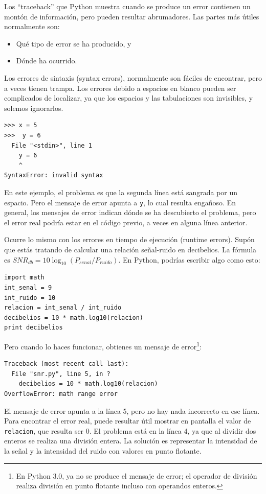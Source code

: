 Los ``traceback'' que Python muestra cuando se produce un error contienen
un montón de información, pero pueden resultar abrumadores. Las partes
más útiles normalmente son:

\begin{itemize}

\item Qué tipo de error se ha producido, y

\item Dónde ha ocurrido.

\end{itemize}

Los errores de sintaxis (syntax errors), normalmente son fáciles de encontrar, pero
a veces tienen trampa. Los errores debido a espacios en blanco pueden ser complicados de
localizar, ya que los espacios y las tabulaciones son invisibles, y solemos ignorarlos.


\beforeverb
\begin{verbatim}
>>> x = 5
>>>  y = 6
  File "<stdin>", line 1
    y = 6
    ^
SyntaxError: invalid syntax
\end{verbatim}
\afterverb
%
En este ejemplo, el problema es que la segunda línea está sangrada por
un espacio. Pero el mensaje de error apunta a {\tt y}, lo cual
resulta engañoso. En general, los mensajes de error indican dónde se ha
descubierto el problema, pero el error real podría estar en el código
previo, a veces en alguna línea anterior.


Ocurre lo mismo con los errores en tiempo de ejecución (runtime errors). Supón que estás tratando
de calcular una relación señal-ruido en decibelios. La fórmula
es $SNR_{db} = 10 \log_{10} (P_{senal} / P_{ruido})$. En Python,
podrías escribir algo como esto:

\beforeverb
\begin{verbatim}
import math
int_senal = 9
int_ruido = 10
relacion = int_senal / int_ruido
decibelios = 10 * math.log10(relacion)
print decibelios
\end{verbatim}
\afterverb
%
Pero cuando lo haces funcionar, obtienes un mensaje de error\footnote{En Python 3.0,
ya no se produce el mensaje de error; el operador de división realiza
división en punto flotante incluso con operandos enteros.}:


\beforeverb
\begin{verbatim}
Traceback (most recent call last):
  File "snr.py", line 5, in ?
    decibelios = 10 * math.log10(relacion)
OverflowError: math range error
\end{verbatim}
\afterverb
%
El mensaje de error apunta a la línea 5, pero no hay nada
incorrecto en ese línea. Para encontrar el error real, puede resultar
útil mostrar en pantalla el valor de {\tt relacion}, que resulta ser
0. El problema está en la línea 4, ya que al dividir dos enteros
se realiza una división entera. La solución es representar la intensidad
de la señal y la intensidad del ruido con valores en punto flotante.

